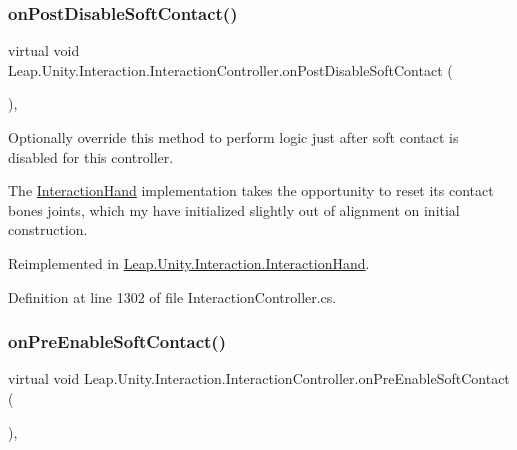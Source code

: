 \subsubsection{\texorpdfstring{onPostDisableSoftContact()}{onPostDisableSoftContact()}}
{\footnotesize\ttfamily virtual void Leap.\+Unity.\+Interaction.\+Interaction\+Controller.\+on\+Post\+Disable\+Soft\+Contact (\begin{DoxyParamCaption}{ }\end{DoxyParamCaption})\hspace{0.3cm}{\ttfamily [protected]}, {\ttfamily [virtual]}}



Optionally override this method to perform logic just after soft contact is disabled for this controller. 

The \mbox{\hyperlink{class_leap_1_1_unity_1_1_interaction_1_1_interaction_hand}{Interaction\+Hand}} implementation takes the opportunity to reset its contact bone\textquotesingle{}s joints, which my have initialized slightly out of alignment on initial construction. 

Reimplemented in \mbox{\hyperlink{class_leap_1_1_unity_1_1_interaction_1_1_interaction_hand_abeba3757a254063269d0a417ac0611d0}{Leap.\+Unity.\+Interaction.\+Interaction\+Hand}}.



Definition at line 1302 of file Interaction\+Controller.\+cs.

\mbox{\label{class_leap_1_1_unity_1_1_interaction_1_1_interaction_controller_ae5952ec4f81442c19ecb558bbcfebaa2}} 
\subsubsection{\texorpdfstring{onPreEnableSoftContact()}{onPreEnableSoftContact()}}
{\footnotesize\ttfamily virtual void Leap.\+Unity.\+Interaction.\+Interaction\+Controller.\+on\+Pre\+Enable\+Soft\+Contact (\begin{DoxyParamCaption}{ }\end{DoxyParamCaption})\hspace{0.3cm}{\ttfamily [protected]}, {\ttfamily [virtual]}}



